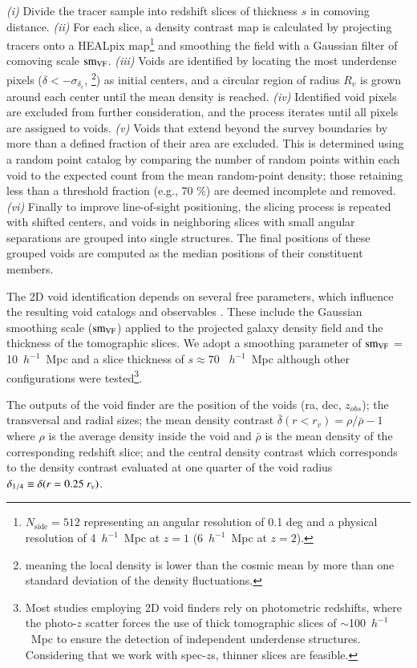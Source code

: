 \documentclass[]{aa} %
\begin{document}
{\it (i)} Divide the tracer sample into redshift slices of thickness $s$ in comoving distance. {\it (ii)} For each slice, a density contrast map is calculated by projecting tracers onto a HEALpix map\footnote{$N_{\textrm{side}} = 512$ representing an angular resolution of 0.1 deg and a physical resolution of 4~$h^{-1}$~Mpc at $z=1$ (6~$h^{-1}$~Mpc at $z=2$).} and smoothing the field with a Gaussian filter of comoving scale $\rm sm_{VF}$. {\it (iii)} Voids are identified by locating the most underdense pixels ($\delta < -\sigma_{\delta_c}$, \footnote{meaning the local density is lower than the cosmic mean by more than one standard deviation of the density fluctuations.}) as initial centers, and a circular region of radius $R_v$ is grown around each center until the mean density is reached. {\it (iv)} Identified void pixels are excluded from further consideration, and the process iterates until all pixels are assigned to voids. {\it (v)} Voids that extend beyond the survey boundaries by more than a defined fraction of their area are excluded. This is determined using a random point catalog by comparing the number of random points within each void to the expected count from the mean random-point density; those retaining less than a threshold fraction (e.g., 70 $\%$) are deemed incomplete and removed. {\it (vi)} Finally to improve line-of-sight positioning, the slicing process is repeated with shifted centers, and voids in neighboring slices with small angular separations are grouped into single structures. The final positions of these grouped voids are computed as the median positions of their constituent members.

The 2D void identification depends on several free parameters, which influence the resulting void catalogs and observables \citep[see e.g.,][]{vielzeuf2021desy1}. These include the Gaussian smoothing scale ($\rm sm_{VF}$) applied to the projected galaxy density field and the thickness of the tomographic slices. We adopt a smoothing parameter of $\rm sm_{VF}$ = 10~$h^{-1}$~Mpc and a slice thickness of $s \approx 70$ ~$h^{-1}$~Mpc although other configurations were tested\footnote{Most studies employing 2D void finders rely on photometric redshifts, where the photo-$z$ scatter forces the use of thick tomographic slices of $\sim$100~$h^{-1}$~Mpc  \citep{sanchez20162d} to ensure the detection of independent underdense structures. Considering that we work with spec-$z$s, thinner slices are feasible.}.




The outputs of the void finder are the position of the voids (ra, dec, $z_{obs}$); the transversal and radial sizes; the mean density contrast $\bar{\delta} (r<r_v) = \rho/\bar{\rho}-1$ where $\rho$ is the average density inside the void and $\bar{\rho}$ is the mean density of the corresponding redshift slice; and the central density contrast which corresponds to the density contrast evaluated at one quarter of the void radius $\delta_{\rm 1/4}\equiv \delta(r=0.25~r_v)$.
\end{document}
